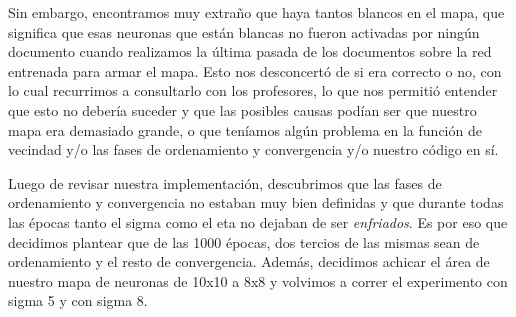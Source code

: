 Sin embargo, encontramos muy extraño que haya tantos blancos en el mapa, que significa que esas neuronas que están blancas no fueron activadas por ningún documento cuando realizamos la última pasada de los documentos sobre la red entrenada para armar el mapa. Esto nos desconcertó de si era correcto o no, con lo cual recurrimos a consultarlo con los profesores, lo que nos permitió entender que esto no debería suceder y que las posibles causas podían ser que nuestro mapa era demasiado grande, o que teníamos algún problema en la función de vecindad y/o las fases de ordenamiento y convergencia y/o nuestro código en sí.

Luego de revisar nuestra implementación, descubrimos que las fases de ordenamiento y convergencia no estaban muy bien definidas y que durante todas las épocas tanto el sigma como el eta no dejaban de ser \textit{enfriados}. Es por eso que decidimos plantear que de las 1000 épocas, dos tercios de las mismas sean de ordenamiento y el resto de convergencia. Además, decidimos achicar el área de nuestro mapa de neuronas de 10x10 a 8x8 y volvimos a correr el experimento con sigma 5 y con sigma 8.

